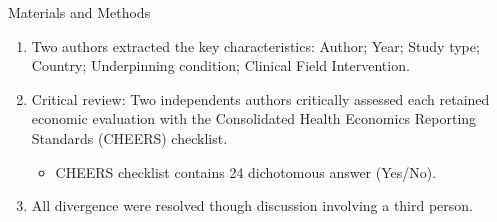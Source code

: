 \documentclass[final]{beamer}
\newlength{\onecolwid}
\begin{document}
\begin{frame}[t]
\begin{columns}[t]
\begin{column}{\onecolwid}
\begin{block}{Materials and Methods}
\begin{enumerate}
\begin{itemize}
    \item \justifying Some exclusion criteria:
        \begin{itemize}
        \item Not an obvious cost-utility analysis (no utility measure in list of outcomes);
        \item Not clearly and specifically relate to the economic evaluation of a family/carer intervention.
        \end{itemize}
    \item Does not use a measure of family carer health utility.
        \end{itemize}
\item \justifying Two authors extracted the key characteristics: Author; Year; Study type; Country; Underpinning condition; Clinical Field Intervention.
\item \justifying Critical review: Two independents authors critically assessed each retained economic evaluation with the Consolidated Health Economics Reporting Standards (CHEERS) checklist.

\begin{itemize}
\item CHEERS checklist contains 24 dichotomous answer (Yes/No).
\end{itemize}
\item \justifying All divergence were resolved though discussion involving a third person.
\end{enumerate}

\end{block}

\begin{columns}
\begin{column}{\onecolwid} %


\end{column}
\end{columns}
\end{column}
\end{columns}
\end{frame}
\end{document}
